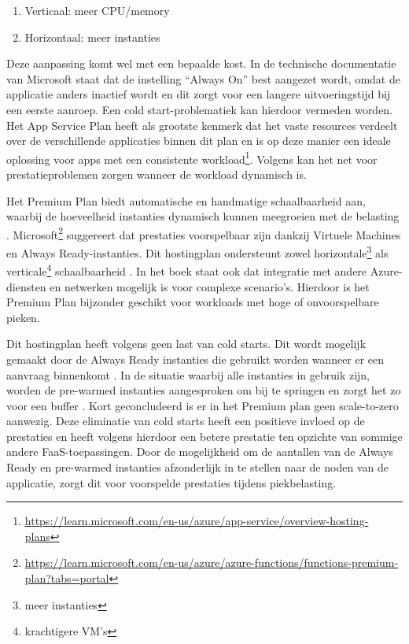 \begin{enumerate}
    \item Verticaal: meer CPU/memory
    \item Horizontaal: meer instanties
\end{enumerate}

Deze aanpassing komt wel met een bepaalde kost. In de technische documentatie van Microsoft staat dat de instelling ``Always On'' best aangezet wordt, omdat de applicatie anders inactief wordt en dit zorgt voor een langere uitvoeringstijd bij een eerste aanroep. Een cold start-problematiek kan hierdoor vermeden worden. Het App Service Plan heeft als grootste kenmerk dat het vaste resources verdeelt over de verschillende applicaties binnen dit plan en is op deze manier een ideale oplossing voor apps met een consistente workload\footnote{\label{af:overview-hosting-options}\url{https://learn.microsoft.com/en-us/azure/app-service/overview-hosting-plans}}. Volgens \textcite{VishalHazarika2024} kan het net voor prestatieproblemen zorgen wanneer de workload dynamisch is.

Het Premium Plan biedt automatische en handmatige schaalbaarheid aan, waarbij de hoeveelheid instanties dynamisch kunnen meegroeien met de belasting \autocite{Mishra2025}. Microsoft\footnote{\label{af:premium-plan-portal}\url{https://learn.microsoft.com/en-us/azure/azure-functions/functions-premium-plan?tabs=portal}} suggereert dat prestaties voorspelbaar zijn dankzij Virtuele Machines en Always Ready-instanties. Dit hostingplan ondersteunt zowel horizontale\footnote{meer instanties} als verticale\footnote{krachtigere VM’s} schaalbaarheid \autocite{Mishra2025}. In het boek \textcite{Mishra2025} staat ook dat integratie met andere Azure-diensten en netwerken mogelijk is voor complexe scenario’s. Hierdoor is het Premium Plan bijzonder geschikt voor workloads met hoge of onvoorspelbare pieken.

Dit hostingplan heeft volgens \textcite{Mishra2025} geen last van cold starts. Dit wordt mogelijk gemaakt door de Always Ready instanties die gebruikt worden wanneer er een aanvraag binnenkomt \autocite{Sawhney2023}. In de situatie waarbij alle instanties in gebruik zijn, worden de pre-warmed instanties aangesproken om bij te springen en zorgt het zo voor een buffer \autocite{Sawhney2023}. Kort geconcludeerd is er in het Premium plan geen scale-to-zero aanwezig. Deze eliminatie van cold starts heeft een positieve invloed op de prestaties \autocite{Mishra2025} en heeft volgens \textcite{Chippagiri2025} hierdoor een betere prestatie ten opzichte van sommige andere FaaS-toepassingen.
Door de mogelijkheid om de aantallen van de Always Ready en pre-warmed instanties afzonderlijk in te stellen naar de noden van de applicatie, zorgt dit voor voorspelde prestaties tijdens piekbelasting.

